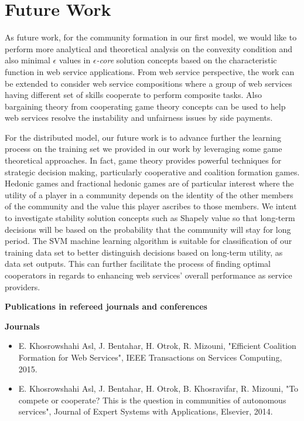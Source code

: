 \section{Future Work}

As future work, for the community formation in our first model, we would like to perform more analytical and theoretical analysis on the convexity condition and also minimal
$\epsilon$ values in \emph{$\epsilon$-core} solution concepts based on the characteristic function in web service applications. From web service perspective, the work can be extended to consider web service compositions where a group of web services having different set of skills cooperate to perform composite tasks. Also bargaining theory from cooperating game theory concepts can be used to help web services resolve the instability and unfairness issues by side payments.

For the distributed model, our future work is to advance further the learning process on the training set we provided in our work by leveraging some game theoretical approaches. In fact, game theory provides powerful techniques for strategic decision making, particularly cooperative and coalition formation games. Hedonic games and fractional hedonic games are of particular interest where the utility of a player in a community depends on the identity of the other members of the community and the value this player ascribes to those members. We intent to investigate stability solution concepts such as Shapely value so that long-term decisions will be based on the probability that the community will stay for long period. The SVM machine learning algorithm is suitable for classification of our training data set to better distinguish  decisions based on long-term utility, as data set outputs. This can further facilitate the process of finding optimal cooperators in regards to enhancing web services' overall performance as service providers.

\newpage
\textbf{Publications in refereed journals and conferences}

\textbf{Journals}

\begin{itemize}
\item E. Khosrowshahi Asl, J. Bentahar, H. Otrok, R. Mizouni, "Efficient Coalition Formation for Web Services", IEEE Transactions on Services Computing, 2015.

\item E. Khosrowshahi Asl, J. Bentahar, H. Otrok, B. Khosravifar, R. Mizouni, "To compete or cooperate? This is the question in communities of autonomous services", Journal of Expert Systems with Applications, Elsevier, 2014.


\end{itemize}

